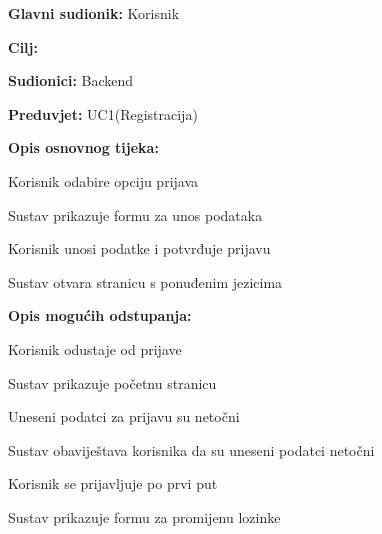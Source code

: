 					
					\noindent {}
					\begin{packed_item}
						
						\item \textbf{Glavni sudionik: } Korisnik
						\item  \textbf{Cilj:} 
						\item  \textbf{Sudionici:} Backend
						\item  \textbf{Preduvjet:} UC1(Registracija)
						\item  \textbf{Opis osnovnog tijeka:}
						
						\item[] \begin{packed_enum}
							
							\item Korisnik odabire opciju prijava
							\item Sustav prikazuje formu za unos podataka
							\item Korisnik unosi podatke i potvrđuje prijavu
							\item Sustav otvara stranicu s ponuđenim jezicima
						\end{packed_enum}
						
						\item  \textbf{Opis mogućih odstupanja:}
						
						\item[] \begin{packed_item}
							
							\item[3.a] Korisnik odustaje od prijave
							\item[] \begin{packed_enum}
								
								\item Sustav prikazuje početnu stranicu
								
							\end{packed_enum}
							
							\item[3.b] Uneseni podatci za prijavu su netočni
							\item[] \begin{packed_enum}
								
								\item Sustav obaviještava korisnika da su uneseni podatci netočni
								
							\end{packed_enum}
							
							\item[3.c] Korisnik se prijavljuje po prvi put
							\item[] \begin{packed_enum}
								
								\item Sustav prikazuje formu za promijenu lozinke
								
							\end{packed_enum}
							
							
						\end{packed_item}
					\end{packed_item}
					
